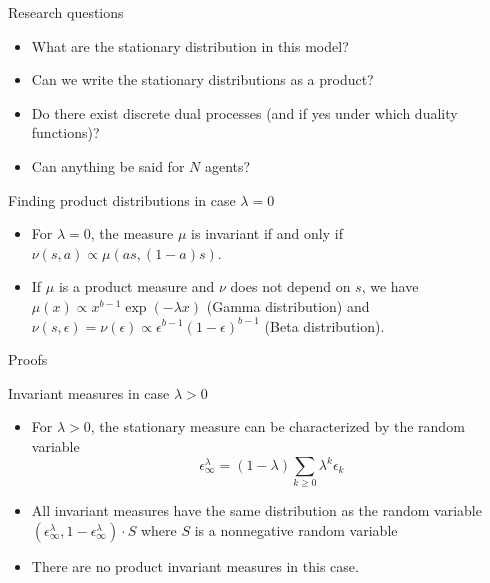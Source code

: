 \documentclass[9pt]{beamer}
\begin{document}
\begin{frame}{Research questions}
\begin{itemize}
\item What are the stationary distribution in this model?
\item Can we write the stationary distributions as a product?
\item Do there exist discrete dual processes (and if yes under which duality functions)?
\item Can anything be said for $N$ agents?
\end{itemize}
\end{frame}



\begin{frame}{Finding product distributions in case $\lambda = 0$}
\begin{itemize}
    \item For $\lambda = 0$, the measure $\mu$ is invariant if and only if $\nu(s, a) \propto \mu(as, (1-a)s)$.
    \item If $\mu$ is a product measure and $\nu$ does not depend on $s$, we have $\mu(x) \propto x^{b-1} \exp(-\lambda x)$ (Gamma distribution) and $\nu(s, \epsilon) = \nu(\epsilon) \propto \epsilon^{b-1}(1-\epsilon)^{b-1}$ (Beta distribution).
\end{itemize}
\end{frame}


\begin{frame}{Proofs}
\end{frame}


\begin{frame}{Invariant measures in case $\lambda > 0$}
\begin{itemize}
    \item For $\lambda > 0$, the stationary measure can be characterized by the random variable
        \[
            \epsilon_{\infty}^{\lambda} = (1-\lambda)\sum_{k \ge 0} \lambda^k \epsilon_k
        \]
    \item All invariant measures have the same distribution as the random variable $(\epsilon_{\infty}^{\lambda}, 1 - \epsilon_{\infty}^{\lambda}) \cdot S$ where $S$ is a nonnegative random variable
    \item There are no product invariant measures in this case.
\end{itemize}
\end{frame}
\end{document}
